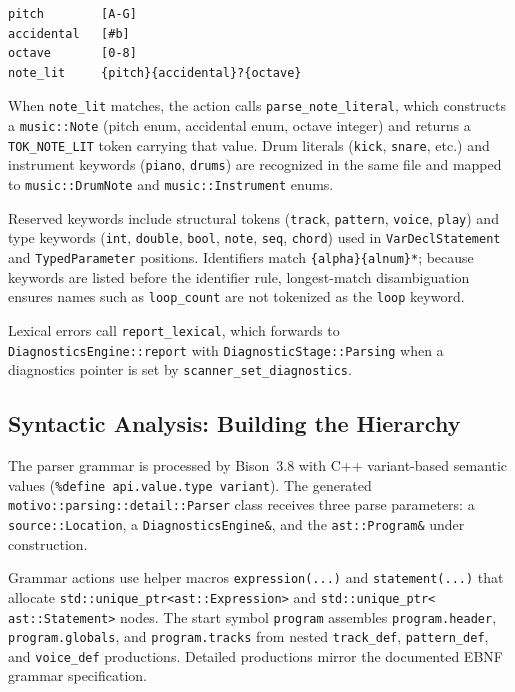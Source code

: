 \begin{lstlisting}[caption={Flex regular expression macros for note literal recognition.},label={detail-lst:scanner-note-macros}]
pitch        [A-G]
accidental   [#b]
octave       [0-8]
note_lit     {pitch}{accidental}?{octave}
\end{lstlisting}

When \texttt{note\_lit} matches, the action calls \texttt{parse\_note\_literal}, which constructs a
\texttt{music::Note} (pitch enum, accidental enum, octave integer) and returns a \texttt{TOK\_NOTE\_LIT} token carrying
that value.
Drum literals (\texttt{kick}, \texttt{snare}, etc.) and instrument keywords (\texttt{piano}, \texttt{drums}) are
recognized in the same file and mapped to \texttt{music::DrumNote} and \texttt{music::Instrument} enums.


Reserved keywords include structural tokens (\texttt{track}, \texttt{pattern}, \texttt{voice}, \texttt{play}) and
type keywords (\texttt{int}, \texttt{double}, \texttt{bool}, \texttt{note}, \texttt{seq}, \texttt{chord}) used in
\texttt{VarDeclStatement} and \texttt{TypedParameter} positions.
Identifiers match \texttt{\{alpha\}\{alnum\}*}; because keywords are listed before the identifier rule, longest-match
disambiguation ensures names such as \texttt{loop\_count} are not tokenized as the \texttt{loop} keyword.

Lexical errors call \texttt{report\_lexical}, which forwards to \texttt{DiagnosticsEngine::report} with
\texttt{DiagnosticStage::Parsing} when a diagnostics pointer is set by \texttt{scanner\_set\_diagnostics}.

\subsection{Syntactic Analysis: Building the Hierarchy}\label{detail-subsec:syntactic-analysis:-building-the-hierarchy}

The parser grammar is processed by Bison~3.8 with C++ variant-based semantic values
(\texttt{\%define api.value.type variant}).
The generated \texttt{motivo::parsing::detail::Parser} class receives three parse parameters: a
\texttt{source::Location}, a \texttt{DiagnosticsEngine\&}, and the \texttt{ast::Program\&} under construction.

Grammar actions use helper macros \texttt{expression(...)} and \texttt{statement(...)} that allocate
\texttt{std::unique\_ptr\textless ast::Expression\textgreater{}} and \texttt{std::unique\_ptr\textless
ast::Statement\textgreater{}} nodes.
The start symbol \texttt{program} assembles \texttt{program.header}, \texttt{program.globals}, and
\texttt{program.tracks} from nested \texttt{track\_def}, \texttt{pattern\_def}, and \texttt{voice\_def} productions.
Detailed productions mirror the documented EBNF grammar specification.

